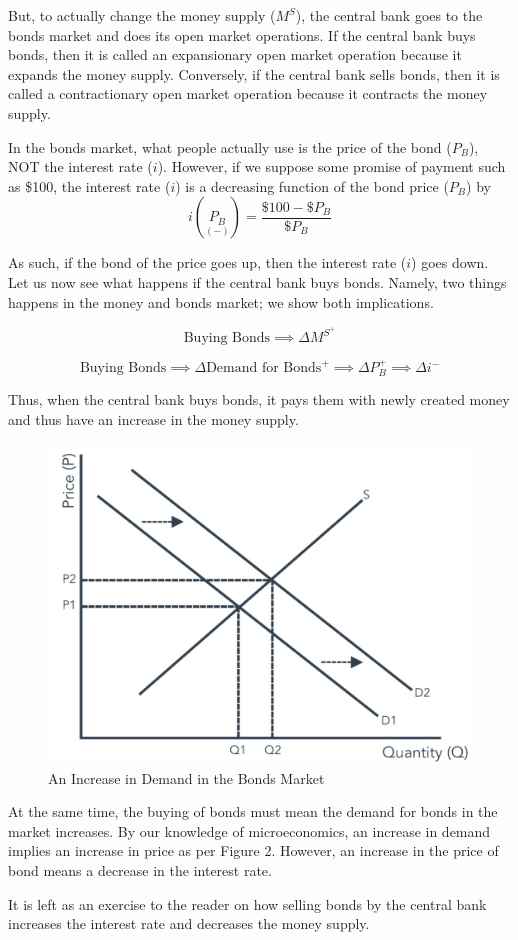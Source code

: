 \documentclass{extarticle}
\begin{document}
But, to actually change the money supply ($M^S$), the central bank goes to the bonds market and does its open market operations. If the central bank buys bonds, then it is called an expansionary open market operation because it expands the money supply. Conversely, if the central bank sells bonds, then it is called a contractionary open market operation because it contracts the money supply.

In the bonds market, what people actually use is the price of the bond ($P_B$), NOT the interest rate ($i$). However, if we suppose some promise of payment such as \$100, the interest rate ($i$) is a decreasing function of the bond price ($P_B$) by
$$i(\underset{(-)}{P_B}) = \frac{\$100 - \$P_B}{\$P_B}$$

As such, if the bond of the price goes up, then the interest rate ($i$) goes down. Let us now see what happens if the central bank buys bonds. Namely, two things happens in the money and bonds market; we show both implications.

$$\text{Buying Bonds} \implies \Delta M^{S^+}$$

$$\text{Buying Bonds} \implies \Delta \text{Demand for Bonds}^+ \implies \Delta P_B^+ \implies \Delta i^-$$

Thus, when the central bank buys bonds, it pays them with newly created money and thus have an increase in the money supply. 

\begin{figure}[h]
  \centering
  \includegraphics[width=0.5\linewidth]{bonds_market.png}
  \caption{An Increase in Demand in the Bonds Market}
  \label{fig:bonds}
\end{figure}

At the same time, the buying of bonds must mean the demand for bonds in the market increases. By our knowledge of microeconomics, an increase in demand implies an increase in price as per Figure 2. However, an increase in the price of bond means a decrease in the interest rate.

It is left as an exercise to the reader on how selling bonds by the central bank increases the interest rate and decreases the money supply.
\end{document}
